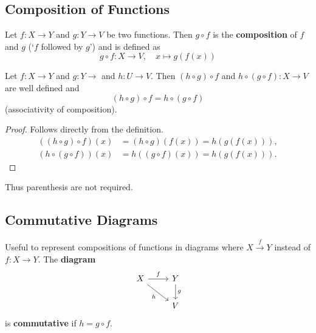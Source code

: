 \subsection{Composition of Functions}

Let $f : X \to Y$ and $g : Y \to V$ be two functions. Then $g \circ f$ is the \textbf{composition} of $f$ and $g$ (`$f$ followed by $g$') and is defined as
$$
g \circ f : X \to V,\quad x \mapsto g(f(x))
$$

\begin{proposition} Let $f : X \to Y$ and $g : Y \to $ and $h : U \to V$. Then $(h \circ g) \circ f$ and $h \circ (g \circ f): X \to V$ are well defined and
    \begin{equation}
        (h \circ g) \circ f = h \circ (g \circ f)
    \end{equation}
    (associativity of composition).

    \begin{proof}
        Follows directly from the definition.
        \begin{align*}
            ((h \circ g) \circ f)(x) &= (h \circ g)(f(x)) = h(g(f(x))), \\
            (h \circ (g \circ f))(x) &= h((g \circ f)(x)) = h(g(f(x))).
        \end{align*}
    \end{proof}

    \noindent Thus parenthesis are not required.
\end{proposition}

\subsection{Commutative Diagrams}
Useful to represent compositions of functions in diagrams where $X \xrightarrow{f} Y$ instead of $f : X \to Y$. The \textbf{diagram}
\[
    \begin{tikzcd}
        X \arrow{r}{f} \arrow[swap]{dr}{h} & Y \arrow{d}{g} \\
        & V
    \end{tikzcd}
\]
is \textbf{commutative} if \(h = g \circ f\).

